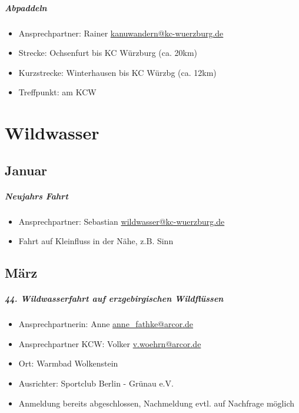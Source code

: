 \documentclass[12pt, a4paper]{report}
\begin{document}
\paragraph{Abpaddeln}
\begin{itemize}
    \item Ansprechpartner: Rainer \href{mailto:kanuwandern@kc-wuerzburg.de}{kanuwandern@kc-wuerzburg.de}
    \item Strecke: Ochsenfurt bis KC Würzburg (ca. 20km)
    \item Kurzstrecke: Winterhausen bis KC Würzbg (ca. 12km)
    \item Treffpunkt: am KCW
\end{itemize}


\chapter*{Wildwasser}
\thispagestyle{Wildwasser}
\pagestyle{Wildwasser}
\section*{Januar}\paragraph{Neujahrs Fahrt}
\begin{itemize}
    \item Ansprechpartner: Sebastian \href{mailto:wildwasser@kc-wuerzburg.de}{wildwasser@kc-wuerzburg.de}
    \item Fahrt auf Kleinfluss in der Nähe, z.B. Sinn 
\end{itemize}

\section*{März}\paragraph{44. Wildwasserfahrt auf erzgebirgischen Wildflüssen}
\begin{itemize}
    \item Ansprechpartnerin: Anne \href{mailto:anne\_fathke@arcor.de}{anne\_fathke@arcor.de}
    \item Ansprechpartner KCW: Volker \href{mailto:v.woehrn@arcor.de}{v.woehrn@arcor.de}
    \item Ort:  Warmbad Wolkenstein
    \item Ausrichter: Sportclub Berlin - Grünau e.V.
    \item Anmeldung bereits abgeschlossen, Nachmeldung evtl. auf Nachfrage möglich
\end{itemize}
\end{document}
